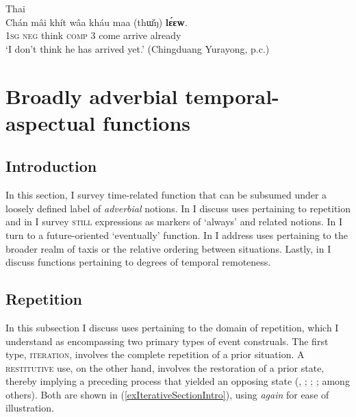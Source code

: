 \begin{exe}
 	 \ex Thai\label{exInterrogativeYetThai6}\\
	 \gll Chán	mâi	khít	wâa		kháu	maa		\textup{(}thɯ̌ŋ\textup{)}	\textbf{lɛ́ɛw}.\\
	 1\textsc{sg} \textsc{neg} think \textsc{comp} 3 come \phantom{(}arrive already\\
	 \glt \lq I don't think he has arrived yet.' (Chingduang Yurayong, p.c.)
\end{exe}

\section{Broadly adverbial temporal-aspectual functions}\label{sectionAdverbial}
\subsection{Introduction}
In this section, I survey time-related function that can be subsumed under a loosely defined label of \textit{adverbial} notions. In  I discuss uses pertaining to repetition and in  I survey \textsc{still} expressions as markers of \lq always\rq{ }and related notions. In  I turn to a future-oriented \lq eventually\rq{} function. In  I address uses pertaining to the broader realm of taxis or the relative ordering between situations. Lastly, in  I discuss functions pertaining to degrees of temporal remoteness.

\subsection{Repetition}
\label{sectionRepetition}
In this subsection I discuss uses pertaining to the domain of repetition, which I understand as encompassing two primary types of event construals. The first type, \textsc{iteration}, involves the complete repetition of a prior situation. A \textsc{restitutive} use, on the other hand, involves the restoration of a prior state, thereby implying a preceding process that yielded an opposing state  (\cite{FabriciusHansen1980}, \citeyear{FabriciusHansen2001}; \cite{KampRossdeutscher1994}; \cite{Waelchli2006}; among others). Both are shown in (\ref{exIterativeSectionIntro}), using  \textit{again} for ease of illustration.

